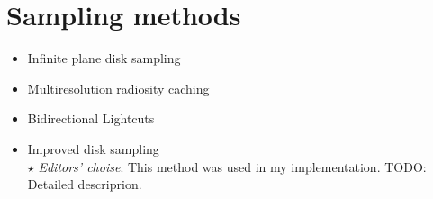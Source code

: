\section{Sampling methods}

\begin{itemize}
    \item{Infinite plane disk sampling \cite{Jensen:2001:PMS:383259.383319}}
    \item{Multiresolution radiosity caching \cite{Christensen:2012:MRC:2343045.2343108}}
    \item{Bidirectional Lightcuts \cite{Walter:2012:BL:2185520.2185555}}
    \item{Improved disk sampling \cite{King:2013:BIS:2504459.2504520}}\\
    $\star$ \textit{Editors' choise}. This method was used in my implementation.
    TODO: Detailed descriprion.
\end{itemize}